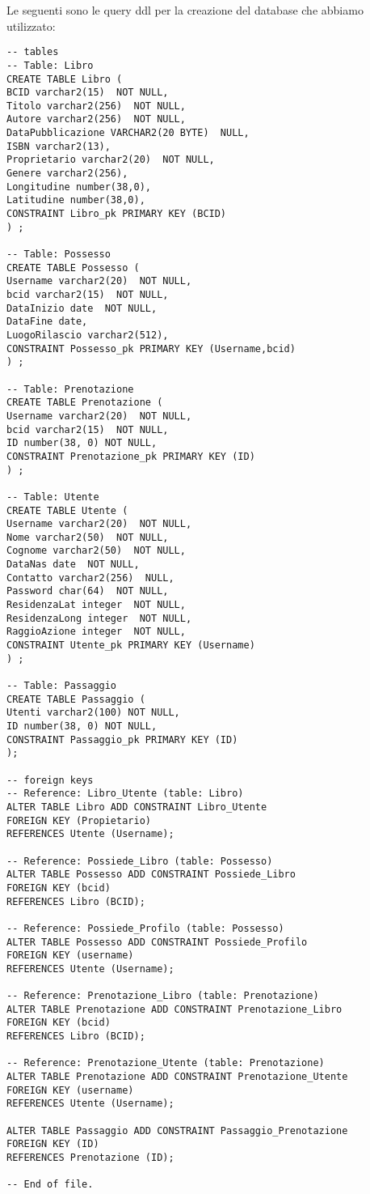 Le seguenti sono le query ddl per la creazione del database che abbiamo utilizzato:
\begin{lstlisting}
-- tables
-- Table: Libro
CREATE TABLE Libro (
BCID varchar2(15)  NOT NULL,
Titolo varchar2(256)  NOT NULL,
Autore varchar2(256)  NOT NULL,
DataPubblicazione VARCHAR2(20 BYTE)  NULL,
ISBN varchar2(13),
Proprietario varchar2(20)  NOT NULL,
Genere varchar2(256),
Longitudine number(38,0),
Latitudine number(38,0),
CONSTRAINT Libro_pk PRIMARY KEY (BCID)
) ;

-- Table: Possesso
CREATE TABLE Possesso (
Username varchar2(20)  NOT NULL,
bcid varchar2(15)  NOT NULL,
DataInizio date  NOT NULL,
DataFine date,
LuogoRilascio varchar2(512),
CONSTRAINT Possesso_pk PRIMARY KEY (Username,bcid)
) ;

-- Table: Prenotazione
CREATE TABLE Prenotazione (
Username varchar2(20)  NOT NULL,
bcid varchar2(15)  NOT NULL,
ID number(38, 0) NOT NULL,
CONSTRAINT Prenotazione_pk PRIMARY KEY (ID)
) ;

-- Table: Utente
CREATE TABLE Utente (
Username varchar2(20)  NOT NULL,
Nome varchar2(50)  NOT NULL,
Cognome varchar2(50)  NOT NULL,
DataNas date  NOT NULL,
Contatto varchar2(256)  NULL,
Password char(64)  NOT NULL,
ResidenzaLat integer  NOT NULL,
ResidenzaLong integer  NOT NULL,
RaggioAzione integer  NOT NULL,
CONSTRAINT Utente_pk PRIMARY KEY (Username)
) ;

-- Table: Passaggio
CREATE TABLE Passaggio (
Utenti varchar2(100) NOT NULL,
ID number(38, 0) NOT NULL,
CONSTRAINT Passaggio_pk PRIMARY KEY (ID)
);

-- foreign keys
-- Reference: Libro_Utente (table: Libro)
ALTER TABLE Libro ADD CONSTRAINT Libro_Utente
FOREIGN KEY (Propietario)
REFERENCES Utente (Username);

-- Reference: Possiede_Libro (table: Possesso)
ALTER TABLE Possesso ADD CONSTRAINT Possiede_Libro
FOREIGN KEY (bcid)
REFERENCES Libro (BCID);

-- Reference: Possiede_Profilo (table: Possesso)
ALTER TABLE Possesso ADD CONSTRAINT Possiede_Profilo
FOREIGN KEY (username)
REFERENCES Utente (Username);

-- Reference: Prenotazione_Libro (table: Prenotazione)
ALTER TABLE Prenotazione ADD CONSTRAINT Prenotazione_Libro
FOREIGN KEY (bcid)
REFERENCES Libro (BCID);

-- Reference: Prenotazione_Utente (table: Prenotazione)
ALTER TABLE Prenotazione ADD CONSTRAINT Prenotazione_Utente
FOREIGN KEY (username)
REFERENCES Utente (Username);

ALTER TABLE Passaggio ADD CONSTRAINT Passaggio_Prenotazione 
FOREIGN KEY (ID)
REFERENCES Prenotazione (ID);

-- End of file.


\end{lstlisting}
